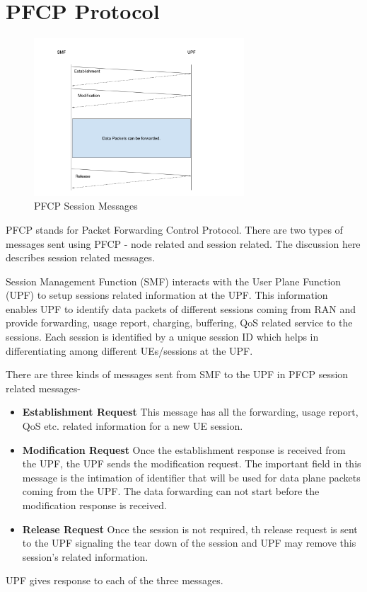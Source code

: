       




\section {PFCP Protocol\label{sec:PFCP}}
 \begin{figure}[htbp]
    \centering
    \includegraphics[width=0.7\textwidth, keepaspectratio]{./fig/Introduction/PFCP.png}
    \caption{PFCP Session Messages}
    \label{fig:PFCP}
\end{figure}

PFCP stands for Packet Forwarding Control Protocol. 
 There are two types of messages sent using PFCP - node related and session related.
 The discussion here describes session related messages.

 Session Management Function (SMF) interacts with the User Plane Function (UPF) to setup sessions related 
 information at the UPF.
This  information enables UPF to identify data packets of different sessions coming from RAN 
and provide forwarding, usage report, charging, buffering, QoS related service to the sessions.
Each session is identified by a unique session ID which helps in differentiating 
among different UEs/sessions at the UPF. 

There are three kinds of messages sent from SMF to the UPF in PFCP session related messages-
\begin{itemize}
	\item \textbf{Establishment Request} This message has all the forwarding, usage report, QoS etc. related information for  a new UE session.  
	\item \textbf{Modification Request} Once the establishment response is
	received from the UPF, the UPF sends the modification request. The important field in this message is the intimation of identifier that will be used for data plane packets coming from the UPF. The data forwarding can not start before the modification response is received.
	\item \textbf{Release Request} Once the session is not required, th release 
	request is sent to the UPF signaling the tear down of the session and UPF
	 may remove this session's related information.
\end{itemize}
UPF gives response to each of the three messages. 
